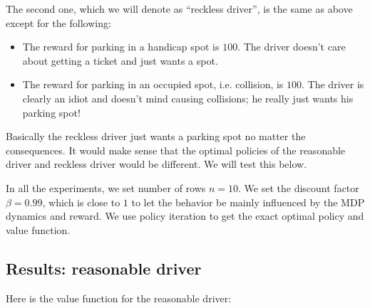 \documentclass[paper=a4, fontsize=11pt]{scrartcl}
\begin{document}
The second one, which we will denote as ``reckless driver'', is the same as above except for the following:

\begin{itemize}
\item The reward for parking in a handicap spot is $100$. The driver doesn't care about getting a ticket and just wants a spot.
\item The reward for parking in an occupied spot, i.e. collision, is $100$. The driver is clearly an idiot and doesn't mind causing collisions; he really just wants his parking spot!
\end{itemize}

Basically the reckless driver just wants a parking spot no matter the consequences. It would make sense that the optimal policies of the reasonable driver and reckless driver would be different. We will test this below.

In all the experiments, we set number of rows $n=10$. We set the discount factor $\beta = 0.99$, which is close to $1$ to let the behavior be mainly influenced by the MDP dynamics and reward. We use policy iteration to get the exact optimal policy and value function.

\subsection{Results: reasonable driver}

Here is the value function for the reasonable driver:
\end{document}
